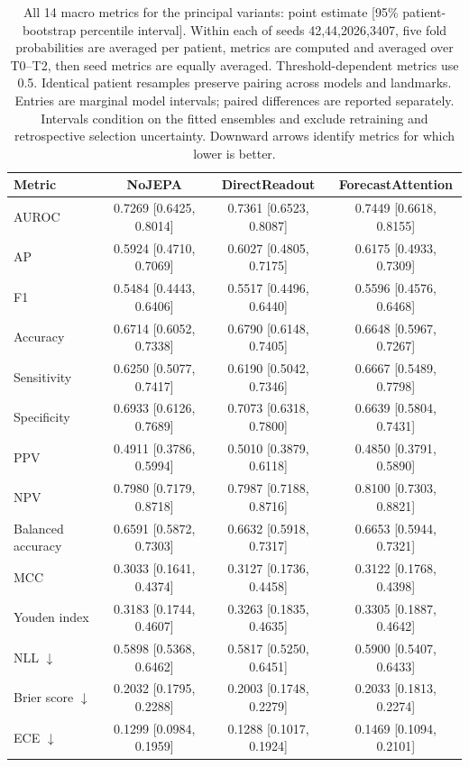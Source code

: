 \begin{table}[t]
\centering
\footnotesize
\setlength{\tabcolsep}{5pt}
\caption{All 14 macro metrics for the principal variants: point estimate [95\% patient-bootstrap percentile interval]. Within each of seeds 42,44,2026,3407, five fold probabilities are averaged per patient, metrics are computed and averaged over T0--T2, then seed metrics are equally averaged. Threshold-dependent metrics use 0.5. Identical patient resamples preserve pairing across models and landmarks. Entries are marginal model intervals; paired differences are reported separately. Intervals condition on the fitted ensembles and exclude retraining and retrospective selection uncertainty. Downward arrows identify metrics for which lower is better.}
\label{tab:extended_macro}
\begin{tabular}{lccc}
\toprule
Metric & NoJEPA & DirectReadout & ForecastAttention \\
\midrule
AUROC & 0.7269 [0.6425, 0.8014] & 0.7361 [0.6523, 0.8087] & 0.7449 [0.6618, 0.8155] \\
AP & 0.5924 [0.4710, 0.7069] & 0.6027 [0.4805, 0.7175] & 0.6175 [0.4933, 0.7309] \\
F1 & 0.5484 [0.4443, 0.6406] & 0.5517 [0.4496, 0.6440] & 0.5596 [0.4576, 0.6468] \\
Accuracy & 0.6714 [0.6052, 0.7338] & 0.6790 [0.6148, 0.7405] & 0.6648 [0.5967, 0.7267] \\
Sensitivity & 0.6250 [0.5077, 0.7417] & 0.6190 [0.5042, 0.7346] & 0.6667 [0.5489, 0.7798] \\
Specificity & 0.6933 [0.6126, 0.7689] & 0.7073 [0.6318, 0.7800] & 0.6639 [0.5804, 0.7431] \\
PPV & 0.4911 [0.3786, 0.5994] & 0.5010 [0.3879, 0.6118] & 0.4850 [0.3791, 0.5890] \\
NPV & 0.7980 [0.7179, 0.8718] & 0.7987 [0.7188, 0.8716] & 0.8100 [0.7303, 0.8821] \\
Balanced accuracy & 0.6591 [0.5872, 0.7303] & 0.6632 [0.5918, 0.7317] & 0.6653 [0.5944, 0.7321] \\
MCC & 0.3033 [0.1641, 0.4374] & 0.3127 [0.1736, 0.4458] & 0.3122 [0.1768, 0.4398] \\
Youden index & 0.3183 [0.1744, 0.4607] & 0.3263 [0.1835, 0.4635] & 0.3305 [0.1887, 0.4642] \\
NLL $\downarrow$ & 0.5898 [0.5368, 0.6462] & 0.5817 [0.5250, 0.6451] & 0.5900 [0.5407, 0.6433] \\
Brier score $\downarrow$ & 0.2032 [0.1795, 0.2288] & 0.2003 [0.1748, 0.2279] & 0.2033 [0.1813, 0.2274] \\
ECE $\downarrow$ & 0.1299 [0.0984, 0.1959] & 0.1288 [0.1017, 0.1924] & 0.1469 [0.1094, 0.2101] \\
\bottomrule
\end{tabular}
\end{table}
